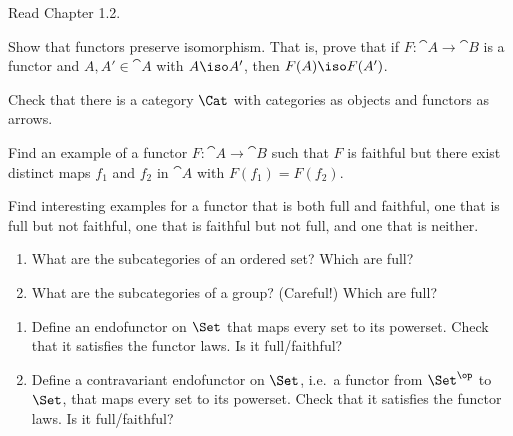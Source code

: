 \def\pathToRoot{../../}

\DeclareMathOperator{\A}{\mathscr A}
\DeclareMathOperator{\B}{\mathscr B}
\DeclareMathOperator{\M}{\mathscr M}




\author{Mostafa Ahmed Abdelfattah Abouhamra, Felix Rech, Dominik Wagner}

\begin{hint}
  Read Chapter 1.2.
\end{hint}

\begin{exercise}
Show that functors preserve isomorphism. That is, prove that if $F : \cat{A} \to \cat{B}$ is a functor and $A, A' \in \cat{A}$ with $A \iso A'$, then $F(A) \iso F(A')$.
\end{exercise}

\begin{exercise}
  Check that there is a category $\Cat$ with categories as objects and functors as arrows.
\end{exercise}

\begin{exercise}
  Find an example of a functor $F : \cat{A} \to \cat{B}$ such that $F$ is faithful but there exist distinct maps $f_1$ and $f_2$ in $\cat{A}$ with $F(f_1) = F(f_2)$.
\end{exercise}

\begin{exercise}
  Find interesting examples for a functor that is both full and faithful, one that is full but not faithful, one that is faithful but not full, and one that is neither.
\end{exercise}

\begin{exercise}
  \begin{enumerate}
    \item What are the subcategories of an ordered set? Which are full?
    \item What are the subcategories of a group? (Careful!)
      Which are full?
  \end{enumerate}
\end{exercise}

\begin{exercise}
  \begin{enumerate}
    \item Define an endofunctor on $\Set$ that maps every set to its powerset.
      Check that it satisfies the functor laws.
      Is it full/faithful?
    \item Define a contravariant endofunctor on $\Set$, i.e.\ a functor from $\Set^\op$ to $\Set$, that maps every set to its powerset.
      Check that it satisfies the functor laws.
      Is it full/faithful?
  \end{enumerate}
\end{exercise}

